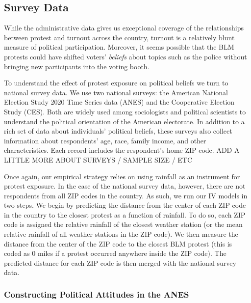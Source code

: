 \documentclass[
  12pt,
]{article}
\begin{document}
\hypertarget{survey-data}{%
\subsection*{Survey Data}\label{survey-data}}

While the administrative data gives us exceptional coverage of the relationships between protest and turnout across the country, turnout is a relatively blunt measure of political participation. Moreover, it seems possible that the BLM protests could have shifted voters' \emph{beliefs} about topics such as the police without bringing new participants into the voting booth.

To understand the effect of protest exposure on political beliefs we turn to national survey data. We use two national surveys: the American National Election Study 2020 Time Series data (ANES) and the Cooperative Election Study (CES). Both are widely used among sociologists and political scientists to understand the political orientation of the American electorate. In addition to a rich set of data about individuals' political beliefs, these surveys also collect information about respondents' age, race, family income, and other characteristics. Each record includes the respondent's home ZIP code. ADD A LITTLE MORE ABOUT SURVEYS / SAMPLE SIZE / ETC

Once again, our empirical strategy relies on using rainfall as an instrument for protest exposure. In the case of the national survey data, however, there are not respondents from all ZIP codes in the country. As such, we run our IV models in two steps. We begin by predicting the distance from the center of each ZIP code in the country to the closest protest as a function of rainfall. To do so, each ZIP code is assigned the relative rainfall of the closest weather station (or the mean relative rainfall of all weather stations in the ZIP code). We then measure the distance from the center of the ZIP code to the closest BLM protest (this is coded as 0 miles if a protest occurred anywhere inside the ZIP code). The predicted distance for each ZIP code is then merged with the national survey data.

\hypertarget{constructing-political-attitudes-in-the-anes}{%
\subsubsection*{Constructing Political Attitudes in the ANES}\label{constructing-political-attitudes-in-the-anes}}
\end{document}
